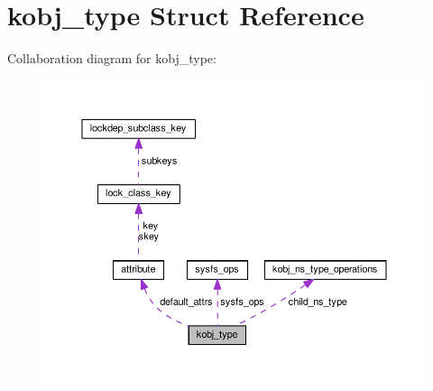 \hypertarget{structkobj__type}{}\section{kobj\+\_\+type Struct Reference}
\label{structkobj__type}


Collaboration diagram for kobj\+\_\+type\+:
\nopagebreak
\begin{figure}[H]
\begin{center}
\leavevmode
\includegraphics[width=350pt]{structkobj__type__coll__graph}
\end{center}
\end{figure}
